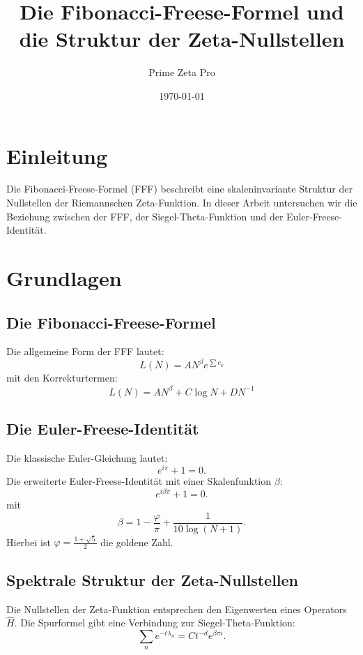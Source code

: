 \documentclass[a4paper,12pt]{article}
\title{Die Fibonacci-Freese-Formel und die Struktur der Zeta-Nullstellen}
\author{Prime Zeta Pro}
\date{\today}
\begin{document}
\maketitle

\section{Einleitung}
Die Fibonacci-Freese-Formel (FFF) beschreibt eine skaleninvariante Struktur der Nullstellen der Riemannschen Zeta-Funktion. In dieser Arbeit untersuchen wir die Beziehung zwischen der FFF, der Siegel-Theta-Funktion und der Euler-Freese-Identität.

\section{Grundlagen}

\subsection{Die Fibonacci-Freese-Formel}
Die allgemeine Form der FFF lautet:
\begin{equation}
    L(N) = A N^\beta e^{\sum c_k}
\end{equation}
mit den Korrekturtermen:
\begin{equation}
    L(N) = A N^\beta + C \log N + D N^{-1}
\end{equation}

\subsection{Die Euler-Freese-Identität}
Die klassische Euler-Gleichung lautet:
\begin{equation}
    e^{i \pi} + 1 = 0.
\end{equation}
Die erweiterte Euler-Freese-Identität mit einer Skalenfunktion $\beta$:
\begin{equation}
    e^{i \beta \pi} + 1 = 0.
\end{equation}
mit
\begin{equation}
    \beta = 1 - \frac{\varphi}{\pi} + \frac{1}{10 \log (N+1)}.
\end{equation}
Hierbei ist $\varphi = \frac{1+\sqrt{5}}{2}$ die goldene Zahl.

\subsection{Spektrale Struktur der Zeta-Nullstellen}
Die Nullstellen der Zeta-Funktion entsprechen den Eigenwerten eines Operators $\hat{H}$. Die Spurformel gibt eine Verbindung zur Siegel-Theta-Funktion:
\begin{equation}
    \sum_n e^{-t \lambda_n} = C t^{-d} e^{\beta \pi i}.
\end{equation}
\end{document}
